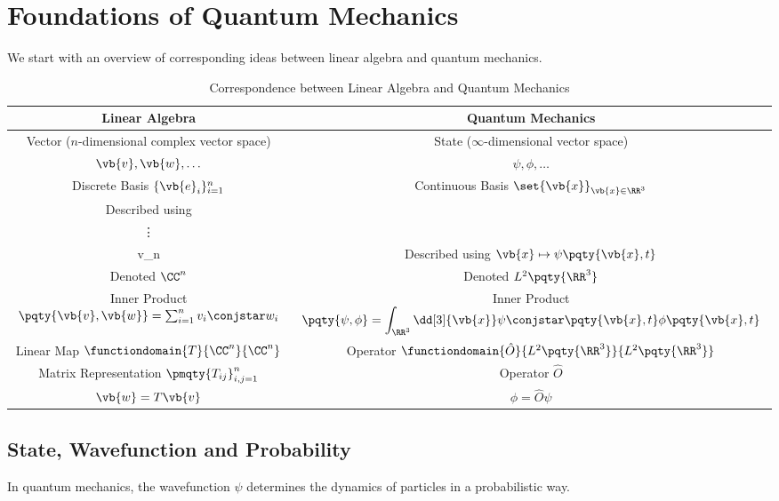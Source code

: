 \section{Foundations of Quantum Mechanics}

We start with an overview of corresponding ideas between linear algebra and quantum mechanics.

\begin{table}[ht!]
    \centering
    \begin{tabular}{cc}
        \toprule
        Linear Algebra & Quantum Mechanics \\
        \midrule
        Vector (\(n\)-dimensional complex vector space) & State (\(\infty\)-dimensional vector space) \\
        \(\vb{v}, \vb{w}, \ldots\) & \(\psi, \phi, \ldots\) \\
        Discrete Basis \(\{\vb{e}_i\}_{i=1}^n\) & Continuous Basis \(\set{\vb{x}}_{\vb{x} \in \RR^3}\) \\
        Described using \(\vb{v} \mapsto \pmqty{v_1 \\ \vdots \\ v_n}\) & Described using \(\vb{x} \mapsto \psi\pqty{\vb{x}, t}\) \\
        Denoted \(\CC^n\) & Denoted \(L^2\pqty{\RR^3}\) \\
        Inner Product \(\pqty{\vb{v}, \vb{w}} = \sum_{i=1}^n {v_i\conjstar} w_i\) & Inner Product \(\displaystyle \pqty{\psi, \phi} = \int_{\RR^3} \dd[3]{\vb{x}} \psi\conjstar \pqty{\vb{x}, t} \phi\pqty{\vb{x}, t}\) \\
        Linear Map \(\functiondomain{T}{\CC^n}{\CC^n}\) & Operator \(\functiondomain{\hat{O}}{L^2\pqty{\RR^3}}{L^2\pqty{\RR^3}}\) \\
        Matrix Representation \(\pmqty{T_{ij}}_{i,j=1}^n\) & Operator \(\hat{O}\) \\
        \(\vb{w} = T \vb{v}\) & \(\phi = \hat{O} \psi\) \\
        \bottomrule
    \end{tabular}
    \caption{Correspondence between Linear Algebra and Quantum Mechanics}
\end{table}

\subsection{State, Wavefunction and Probability}

In quantum mechanics, the wavefunction \(\psi\) determines the dynamics of particles in a probabilistic way.

